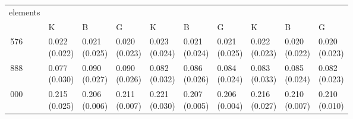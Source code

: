 \begin{table}[H]\centering\begin{tabular}{>{\centering\arraybackslash}m{1.2cm}|>{\centering\arraybackslash}m{1.25cm}>{\centering\arraybackslash}m{1.25cm}>{\centering\arraybackslash}m{1.25cm}|>{\centering\arraybackslash}m{1.25cm}>{\centering\arraybackslash}m{1.25cm}>{\centering\arraybackslash}m{1.25cm}|>{\centering\arraybackslash}m{1.25cm}>{\centering\arraybackslash}m{1.25cm}>{\centering\arraybackslash}m{1.25cm}}
\toprule
elements & \multicolumn{3}{|c}{gravity} & \multicolumn{3}{|c}{traction} & \multicolumn{3}{|c}{compression} \\
 & K & B & G & K & B & G & K & B & G \\
\midrule
24\,576 & \makecell{0.022\\[-4pt](0.022)} & \makecell{0.021\\[-4pt](0.025)} & \makecell{0.020\\[-4pt](0.023)} & \makecell{0.023\\[-4pt](0.024)} & \makecell{0.021\\[-4pt](0.024)} & \makecell{0.021\\[-4pt](0.025)} & \makecell{0.022\\[-4pt](0.023)} & \makecell{0.020\\[-4pt](0.022)} & \makecell{0.020\\[-4pt](0.023)} \\
63\,888 & \makecell{0.077\\[-4pt](0.030)} & \makecell{0.090\\[-4pt](0.027)} & \makecell{0.090\\[-4pt](0.026)} & \makecell{0.082\\[-4pt](0.032)} & \makecell{0.086\\[-4pt](0.026)} & \makecell{0.084\\[-4pt](0.024)} & \makecell{0.083\\[-4pt](0.033)} & \makecell{0.085\\[-4pt](0.024)} & \makecell{0.082\\[-4pt](0.023)} \\
162\,000 & \makecell{0.215\\[-4pt](0.025)} & \makecell{0.206\\[-4pt](0.006)} & \makecell{0.211\\[-4pt](0.007)} & \makecell{0.221\\[-4pt](0.030)} & \makecell{0.207\\[-4pt](0.005)} & \makecell{0.206\\[-4pt](0.004)} & \makecell{0.216\\[-4pt](0.027)} & \makecell{0.210\\[-4pt](0.007)} & \makecell{0.210\\[-4pt](0.010)} \\

\end{tabular}
\end{table}
